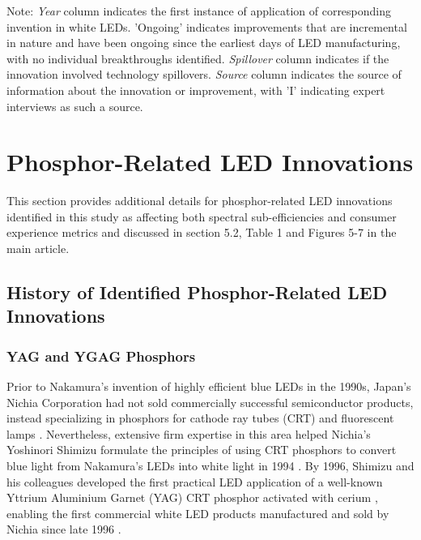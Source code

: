 \documentclass[10pt]{article}
\begin{document}
\begin{table}[H]
     Note: \textit{Year} column indicates the first instance of application of corresponding invention in white LEDs. 'Ongoing' indicates improvements that are incremental in nature and have been ongoing since the earliest days of LED manufacturing, with no individual breakthroughs identified. \textit{Spillover} column indicates if the innovation involved technology spillovers. \textit{Source} column indicates the source of information about the innovation or improvement, with 'I' indicating expert interviews as such a source.
    \label{tab:innovations}
\end{table}

\section{Phosphor-Related LED Innovations}
\label{sec:innovation_phosphor}

This section provides additional details for phosphor-related LED innovations identified in this study as affecting both spectral sub-efficiencies and consumer experience metrics and discussed in section 5.2, Table 1 and Figures 5-7 in the main article.

\subsection{History of Identified Phosphor-Related LED Innovations}

\subsubsection{YAG and YGAG Phosphors}

Prior to Nakamura’s invention of highly efficient blue LEDs in the 1990s, Japan’s Nichia Corporation had not sold commercially successful semiconductor products, instead specializing in phosphors for cathode ray tubes (CRT) and fluorescent lamps \cite{nakamura2013blue}  . Nevertheless, extensive firm expertise in this area helped Nichia’s Yoshinori Shimizu formulate the principles of using CRT phosphors to convert blue light from Nakamura’s LEDs into white light in 1994 \cite{shimizu1994sheet}\cite{cho2017white}. By 1996, Shimizu and his colleagues developed \cite{bando1996}\cite{shimizu1999light} the first practical LED application of a well-known Yttrium Aluminium Garnet (YAG) CRT phosphor activated with cerium \cite{blasse1967new}, enabling the first commercial white LED products manufactured and sold by Nichia since late 1996 \cite{bando1998development}\cite{cho2017white}. 
\end{document}

